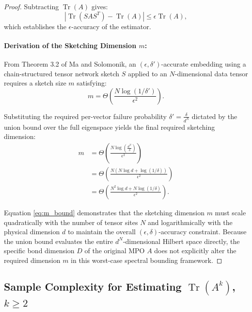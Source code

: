 \documentclass{article}
\theoremstyle{remark}
\begin{document}
\begin{proof}
Subtracting $\operatorname{Tr}(A)$ gives:
\begin{equation}
    \left| \operatorname{Tr}(S A S^T) - \operatorname{Tr}(A) \right| \le \epsilon \operatorname{Tr}(A),
\end{equation}
which establishes the $\epsilon$-accuracy of the estimator.

\paragraph{Derivation of the Sketching Dimension $m$:} 
From Theorem 3.2 of Ma and Solomonik, an $(\epsilon, \delta')$-accurate embedding using a chain-structured tensor network sketch $S$ applied to an $N$-dimensional data tensor requires a sketch size $m$ satisfying:
\begin{equation}
    m = \Theta\left( \frac{N \log(1/\delta')}{\epsilon^2} \right).
\end{equation}

Substituting the required per-vector failure probability $\delta' = \frac{\delta}{d^N}$ dictated by the union bound over the full eigenspace yields the final required sketching dimension:
\begin{align}
    m &= \Theta\left( \frac{N \log\left(\frac{d^N}{\delta}\right)}{\epsilon^2} \right) \\
    &= \Theta\left( \frac{N \left( N \log d + \log(1/\delta) \right)}{\epsilon^2} \right) \\
    &= \Theta\left( \frac{N^2 \log d + N \log(1/\delta)}{\epsilon^2} \right). \label{eq:m_bound}
\end{align}

Equation \ref{eq:m_bound} demonstrates that the sketching dimension $m$ must scale quadratically with the number of tensor sites $N$ and logarithmically with the physical dimension $d$ to maintain the overall $(\epsilon, \delta)$-accuracy constraint. Because the union bound evaluates the entire $d^N$-dimensional Hilbert space directly, the specific bond dimension $D$ of the original MPO $A$ does not explicitly alter the required dimension $m$ in this worst-case spectral bounding framework.
\end{proof}

\subsection{Sample Complexity for Estimating $\operatorname{Tr}(A^k)$, $k \ge 2$}\label{sec:tracek}
\end{document}
